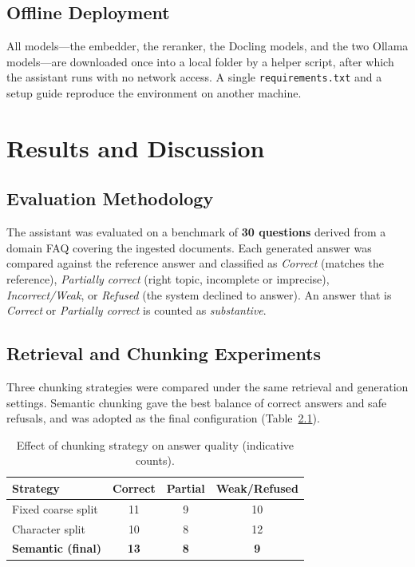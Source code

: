 \documentclass[12pt,a4paper]{report}
\begin{document}
\section{Offline Deployment}
All models---the embedder, the reranker, the Docling models, and the two Ollama
models---are downloaded once into a local folder by a helper script, after which
the assistant runs with no network access. A single \texttt{requirements.txt} and a
setup guide reproduce the environment on another machine.

\chapter{Results and Discussion}

\section{Evaluation Methodology}
The assistant was evaluated on a benchmark of \textbf{30 questions} derived from a
domain FAQ covering the ingested documents. Each generated answer was compared
against the reference answer and classified as \emph{Correct} (matches the
reference), \emph{Partially correct} (right topic, incomplete or imprecise),
\emph{Incorrect/Weak}, or \emph{Refused} (the system declined to answer).
An answer that is \emph{Correct} or \emph{Partially correct} is counted as
\emph{substantive}.

\section{Retrieval and Chunking Experiments}
Three chunking strategies were compared under the same retrieval and generation
settings. Semantic chunking gave the best balance of correct answers and safe
refusals, and was adopted as the final configuration
(Table~\ref{tab:chunkcompare}).

\begin{table}[htbp]
\centering
\caption{Effect of chunking strategy on answer quality (indicative counts).}
\label{tab:chunkcompare}
\begin{tabular}{@{}lccc@{}}
\toprule
\textbf{Strategy} & \textbf{Correct} & \textbf{Partial} & \textbf{Weak/Refused} \\
\midrule
Fixed coarse split   & 11 & 9 & 10 \\
Character split      & 10 & 8 & 12 \\
\textbf{Semantic (final)} & \textbf{13} & \textbf{8} & \textbf{9} \\
\bottomrule
\end{tabular}
\end{table}
\end{document}
